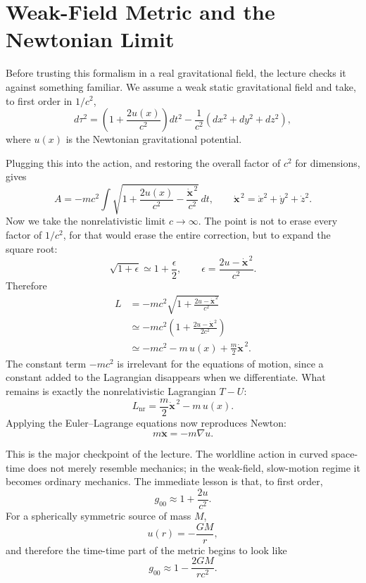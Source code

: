\section{Weak-Field Metric and the Newtonian Limit}

Before trusting this formalism in a real gravitational field, the lecture checks it against something familiar. We assume a weak static gravitational field and take, to first order in \(1/c^2\),
\begin{equation}
d\tau^2 = \left(1+\frac{2u(x)}{c^2}\right)dt^2 - \frac{1}{c^2}(dx^2+dy^2+dz^2),
\end{equation}
where \(u(x)\) is the Newtonian gravitational potential.

Plugging this into the action, and restoring the overall factor of \(c^2\) for dimensions, gives
\begin{equation}
A=-mc^2\int \sqrt{1+\frac{2u(x)}{c^2}-\frac{\dot{\mathbf x}^{\,2}}{c^2}}\,dt,
\qquad
\dot{\mathbf x}^{\,2}=\dot x^2+\dot y^2+\dot z^2.
\end{equation}
Now we take the nonrelativistic limit \(c\to\infty\). The point is not to erase every factor of \(1/c^2\), for that would erase the entire correction, but to expand the square root:
\begin{equation}
\sqrt{1+\epsilon}\simeq 1+\frac{\epsilon}{2},
\qquad
\epsilon=\frac{2u-\dot{\mathbf x}^{\,2}}{c^2}.
\end{equation}
Therefore
\begin{align}
L
&= -mc^2\sqrt{1+\frac{2u-\dot{\mathbf x}^{\,2}}{c^2}} \\
&\simeq -mc^2\left(1+\frac{2u-\dot{\mathbf x}^{\,2}}{2c^2}\right) \\
&\simeq -mc^2 - m\,u(x) + \frac{m}{2}\dot{\mathbf x}^{\,2}.
\end{align}
The constant term \(-mc^2\) is irrelevant for the equations of motion, since a constant added to the Lagrangian disappears when we differentiate. What remains is exactly the nonrelativistic Lagrangian \(T-U\):
\begin{equation}
L_{\mathrm{nr}} = \frac{m}{2}\dot{\mathbf x}^{\,2} - m\,u(x).
\end{equation}
Applying the Euler--Lagrange equations now reproduces Newton:
\begin{equation}
m\ddot{\mathbf x} = -m\nabla u.
\end{equation}

This is the major checkpoint of the lecture. The worldline action in curved space-time does not merely resemble mechanics; in the weak-field, slow-motion regime it becomes ordinary mechanics. The immediate lesson is that, to first order,
\begin{equation}
g_{00}\approx 1+\frac{2u}{c^2}.
\end{equation}
For a spherically symmetric source of mass \(M\),
\begin{equation}
u(r)=-\frac{GM}{r},
\end{equation}
and therefore the time-time part of the metric begins to look like
\begin{equation}
g_{00}\approx 1-\frac{2GM}{rc^2}.
\end{equation}

